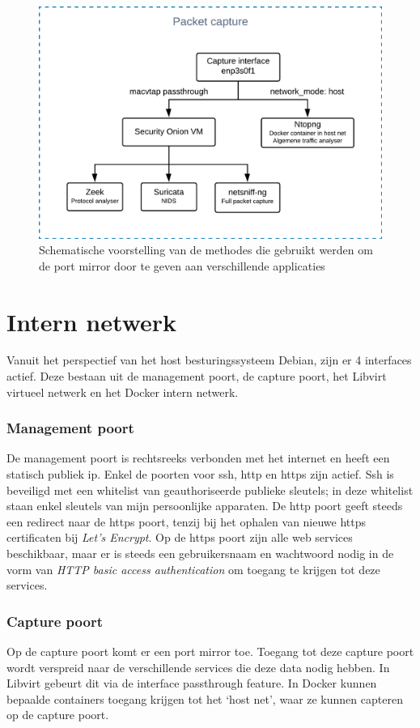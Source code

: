 \documentclass[a4paper,12pt]{report}
\begin{document}
\begin{figure}[H]
  \centering
  \includegraphics[width=\textwidth]{aangepast-systeem-schema-pcap}
  \caption{Schematische voorstelling van de methodes die gebruikt werden om de port mirror door te geven aan verschillende applicaties}
  \label{fig:aangepast-systeem-schema-pcap}
\end{figure}

\section{Intern netwerk}
Vanuit het perspectief van het host besturingssysteem Debian, zijn er 4 interfaces actief.
Deze bestaan uit de management poort, de capture poort, het Libvirt virtueel netwerk en het Docker intern netwerk.

\subsubsection{Management poort}
De management poort is rechtsreeks verbonden met het internet en heeft een statisch publiek ip.
Enkel de poorten voor ssh, http en https zijn actief.
Ssh is beveiligd met een whitelist van geauthoriseerde publieke sleutels; in deze whitelist staan enkel sleutels van mijn persoonlijke apparaten.
De http poort geeft steeds een redirect naar de https poort, tenzij bij het ophalen van nieuwe https certificaten bij \emph{Let's Encrypt}.
Op de https poort zijn alle web services beschikbaar, maar er is steeds een gebruikersnaam en wachtwoord nodig in de vorm van \emph{HTTP basic access authentication} om toegang te krijgen tot deze services.

\subsubsection{Capture poort}
Op de capture poort komt er een port mirror toe.
Toegang tot deze capture poort wordt verspreid naar de verschillende services die deze data nodig hebben.
In Libvirt gebeurt dit via de interface passthrough feature.
In Docker kunnen bepaalde containers toegang krijgen tot het `host net', waar ze kunnen capteren op de capture poort.
\end{document}
